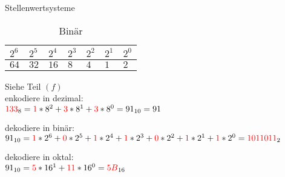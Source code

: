 \begin{solution}{Stellenwertsysteme}

\begin{table}
\caption{Bin\"ar}
\begin{tabular}{l|l|l|l|l|l|l}
$2^6$ & $2^5$ & $2^4$ & $2^3$ & $2^2$ & $2^1$ & $2^0$ \\ \hline
$64$  & $32$  & $16$  & $8$   & $4$   &$1$    & $2$
\end{tabular}
\end{table}
\medskip

Siehe Teil $(f)$\\
enkodiere in dezimal: \\
$\textcolor{red}{133}_8
=
\textcolor{red}{1}*8^2 + \textcolor{red}{3}*8^1 + \textcolor{red}{3}*8^0 = 91_{10} = 91$
\medskip

dekodiere in bin\"ar: \\
$ 91_{10}
=
\textcolor{red}{1}*2^6 + \textcolor{red}{0}*2^5 + \textcolor{red}{1}*2^4 + \textcolor{red}{1}*2^3 + \textcolor{red}{0}*2^2 + \textcolor{red}{1}*2^1 + \textcolor{red}{1}*2^0 = \textcolor{red}{1011011}_2$

dekodiere in oktal: \\
$91_{10}
=
\textcolor{red}{5}*16^1 + \textcolor{red}{11}*16^0 = \textcolor{red}{5B}_{16}
$

\end{solution}
